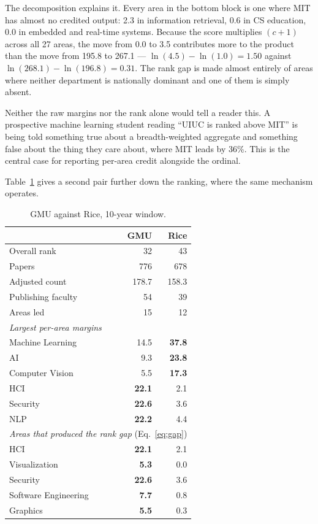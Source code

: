 \documentclass[11pt]{article}
\begin{document}
The decomposition explains it. Every area in the bottom block is one where MIT
has almost no credited output: 2.3 in information retrieval, 0.6 in CS
education, 0.0 in embedded and real-time systems. Because the score multiplies
$(c+1)$ across all 27 areas, the move from 0.0 to 3.5 contributes more to the
product than the move from 195.8 to 267.1 --- $\ln(4.5)-\ln(1.0) = 1.50$ against
$\ln(268.1)-\ln(196.8) = 0.31$. The rank gap is made almost entirely of areas
where neither department is nationally dominant and one of them is simply
absent.

Neither the raw margins nor the rank alone would tell a reader this. A
prospective machine learning student reading ``UIUC is ranked above MIT'' is
being told something true about a breadth-weighted aggregate and something
false about the thing they care about, where MIT leads by 36\%. This is the
central case for reporting per-area credit alongside the ordinal.

Table~\ref{tab:comparegmu} gives a second pair further down the ranking, where
the same mechanism operates.

\begin{table}[t]
\centering
\caption{GMU against Rice, 10-year window.}
\label{tab:comparegmu}
\begin{tabular}{lrr}
\toprule
& GMU & Rice \\
\midrule
Overall rank        & 32    & 43 \\
Papers              & 776   & 678 \\
Adjusted count      & 178.7 & 158.3 \\
Publishing faculty  & 54    & 39 \\
Areas led           & 15    & 12 \\
\midrule
\multicolumn{3}{l}{\emph{Largest per-area margins}} \\
Machine Learning    & 14.5 & \textbf{37.8} \\
AI                  & 9.3  & \textbf{23.8} \\
Computer Vision     & 5.5  & \textbf{17.3} \\
HCI                 & \textbf{22.1} & 2.1 \\
Security            & \textbf{22.6} & 3.6 \\
NLP                 & \textbf{22.2} & 4.4 \\
\midrule
\multicolumn{3}{l}{\emph{Areas that produced the rank gap} (Eq.~\ref{eq:gap})} \\
HCI                 & \textbf{22.1} & 2.1 \\
Visualization       & \textbf{5.3}  & 0.0 \\
Security            & \textbf{22.6} & 3.6 \\
Software Engineering & \textbf{7.7} & 0.8 \\
Graphics            & \textbf{5.5}  & 0.3 \\
\bottomrule
\end{tabular}
\end{table}
\end{document}

